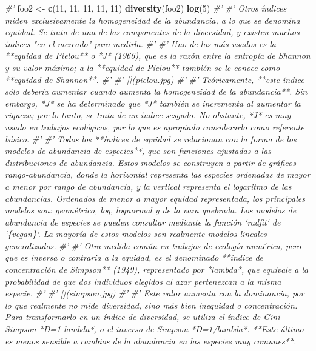 \documentclass[11pt,]{article}
\newenvironment{Shaded}{\begin{snugshade}}{\end{snugshade}}
\newcommand{\KeywordTok}[1]{\textcolor[rgb]{0.13,0.29,0.53}{\textbf{#1}}}
\newcommand{\DecValTok}[1]{\textcolor[rgb]{0.00,0.00,0.81}{#1}}
\newcommand{\StringTok}[1]{\textcolor[rgb]{0.31,0.60,0.02}{#1}}
\newcommand{\CommentTok}[1]{\textcolor[rgb]{0.56,0.35,0.01}{\textit{#1}}}
\newcommand{\NormalTok}[1]{#1}
\begin{document}
\begin{Shaded}
\begin{Highlighting}[]
{\CommentTok{#' }
\NormalTok{foo2 <-}\StringTok{ }\KeywordTok{c}\NormalTok{(}\DecValTok{11}\NormalTok{, }\DecValTok{11}\NormalTok{, }\DecValTok{11}\NormalTok{, }\DecValTok{11}\NormalTok{, }\DecValTok{11}\NormalTok{)}
\KeywordTok{diversity}\NormalTok{(foo2)}
\KeywordTok{log}\NormalTok{(}\DecValTok{5}\NormalTok{)}
\CommentTok{#' }
\CommentTok{#' Otros índices miden exclusivamente la homogeneidad de la abundancia, a lo que se denomina equidad. Se trata de una de las componentes de la diversidad, y existen muchos índices "en el mercado" para medirla.}
\CommentTok{#' }
\CommentTok{#' Uno de los más usados es la **equidad de Pielou** o *J* (1966), que es la razón entre la entropía de Shannon y su valor máximo; a la **equidad de Pielou** también se le conoce como **equidad de Shannon**.}
\CommentTok{#'  }
\CommentTok{#' [](pielou.jpg)}
\CommentTok{#'}
\CommentTok{#' Teóricamente, **este índice sólo debería aumentar cuando aumenta la homogeneidad de la abundancia**. Sin embargo, *J* se ha determinado que *J* también se incrementa al aumentar la riqueza; por lo tanto, se trata de un índice sesgado. No obstante, *J* es muy usado en trabajos ecológicos, por lo que es apropiado considerarlo como referente básico.}
\CommentTok{#' }
\CommentTok{#' Todos los **índices de equidad se relacionan con la forma de los modelos de abundancia de especies**, que son funciones ajustadas a las distribuciones de abundancia. Estos modelos se construyen a partir de gráficos rango-abundancia, donde la horizontal representa las especies ordenadas de mayor a menor por rango de abundancia, y la vertical representa el logaritmo de las abundancias. Ordenados de menor a mayor equidad representada, los principales modelos son: geométrico, log, lognormal y de la vara quebrada. Los modelos de abundancia de especies se pueden consultar mediante la función `radfit` de `\{vegan\}`. La mayoría de estos modelos son realmente modelos lineales generalizados.}
\CommentTok{#' }
\CommentTok{#' Otra medida común en trabajos de ecología numérica, pero que es inversa o contraria a la equidad, es el denominado **índice de concentración de Simpson** (1949), representado por *lambda*, que equivale a la probabilidad de que dos individuos elegidos al azar pertenezcan a la misma especie.}
\CommentTok{#' }
\CommentTok{#' [](simpson.jpg)}
\CommentTok{#' }
\CommentTok{#' Este valor aumenta con la dominancia, por lo que realmente no mide diversidad, sino más bien inequidad o concentración. Para transformarlo en un índice de diversidad, se utiliza el índice de Gini-Simpson *D=1-lambda*, o el inverso de Simpson *D=1/lambda*. **Este último es menos sensible a cambios de la abundancia en las especies muy comunes**.}
}
\end{Highlighting}
\end{Shaded}
\end{document}
